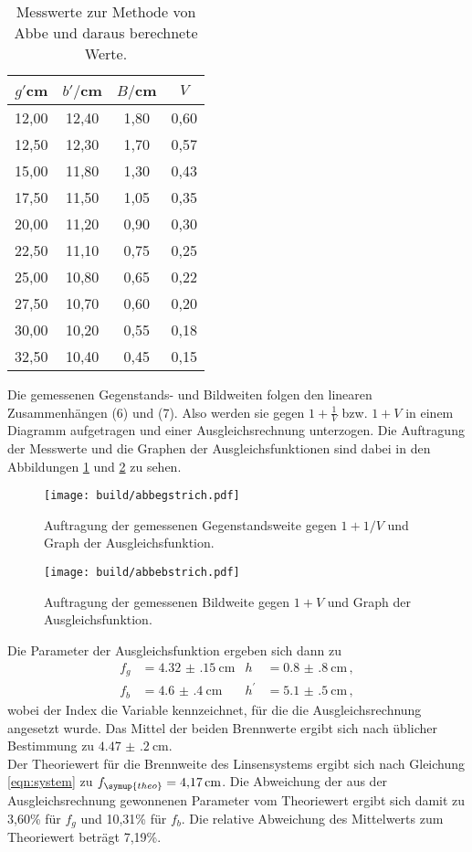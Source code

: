 \begin{table}[htp]
	\begin{center}
    \caption{Messwerte zur Methode von Abbe und daraus berechnete Werte.}
    \label{tab:abbe}
		\begin{tabular}{cccc}
		\toprule
			{$g'$cm} & {$b'/$cm} & {$B/$cm} & {$V$}\\
			\midrule
			12,00 & 12,40 & 1,80 & 0,60\\
			12,50 & 12,30 & 1,70 & 0,57\\
			15,00 & 11,80 & 1,30 & 0,43\\
			17,50 & 11,50 & 1,05 & 0,35\\
			20,00 & 11,20 & 0,90 & 0,30\\
			22,50 & 11,10 & 0,75 & 0,25\\
			25,00 & 10,80 & 0,65 & 0,22\\
			27,50 & 10,70 & 0,60 & 0,20\\
			30,00 & 10,20 & 0,55 & 0,18\\
			32,50 & 10,40 & 0,45 & 0,15\\
		\bottomrule
		\end{tabular}
	\end{center}
\end{table}

Die gemessenen Gegenstands- und Bildweiten folgen den linearen Zusammenhängen
(6) und (7). Also werden sie gegen $1+\frac{1}{V}$ bzw. $1+V$ in einem Diagramm
aufgetragen und einer Ausgleichsrechnung unterzogen. Die Auftragung der Messwerte
und die Graphen der Ausgleichsfunktionen sind dabei in den Abbildungen \ref{fig:gstrich}
und \ref{fig:bstrich} zu sehen.

\begin{figure}%
  \centering
  \texttt{[image: build/abbegstrich.pdf]}
  \caption{Auftragung der gemessenen Gegenstandsweite gegen $1+1/V$ und Graph der Ausgleichsfunktion.}
  \label{fig:gstrich}
\end{figure}

\begin{figure}%
  \centering
  \texttt{[image: build/abbebstrich.pdf]}
  \caption{Auftragung der gemessenen Bildweite gegen $1+V$ und Graph der Ausgleichsfunktion.}
  \label{fig:bstrich}
\end{figure}

Die Parameter der Ausgleichsfunktion ergeben sich dann zu
\begin{align*}
	f_g &= \SI{4.32(15)}{\centi\meter}		&		h &= \SI{0.8(8)}{\centi\meter} \,, \\
	f_b &= \SI{4.6(4)}{\centi\meter}		&		h^\prime &= \SI{5.1(5)}{\centi\meter}\,,
\end{align*}
wobei der Index die Variable kennzeichnet, für die die Ausgleichsrechnung
angesetzt wurde. Das Mittel der beiden Brennwerte ergibt sich nach üblicher
Bestimmung zu $\SI{4.47(20)}{\centi\meter}$. \\
Der Theoriewert für die Brennweite des Linsensystems ergibt sich nach Gleichung
\eqref{eqn:system} zu $f_{\symup{theo}}=\SI{4.17}{\centi\meter}$. Die Abweichung
der aus der Ausgleichsrechnung gewonnenen Parameter vom Theoriewert ergibt sich
damit zu 3,60\% für $f_g$ und 10,31\% für $f_b$. Die relative Abweichung des Mittelwerts
zum Theoriewert beträgt 7,19\%.
